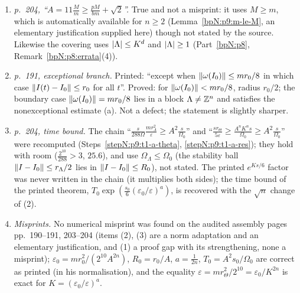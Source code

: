 \begin{remark}
\begin{enumerate}[label=(\arabic*)]
\item \emph{p.~204, ``$A=11\frac Mm\ge\frac{pM}{bm}+\sqrt2$''.} True and not a misprint: it uses $M\ge m$, which is automatically available for $n\ge2$ (Lemma~\ref{bpN:p9:m-le-M}, an elementary justification supplied here) though not stated by the source. Likewise the covering uses $\lvert \Lambda\rvert\le K^d$ and $\lvert \Lambda\rvert\ge1$ (Part~\ref{bpN:p8}, Remark~\ref{bpN:p8:errata}(4)).
\item \emph{p.~191, exceptional branch.} Printed: ``except when $\lVert \omega(I_0)\rVert\le mr_0/8$ in which case $\lVert I(t)-I_0\rVert\le r_0$ for all $t$''. Proved: for $\lVert \omega(I_0)\rVert<mr_0/8$, radius $r_0/2$; the boundary case $\lVert \omega(I_0)\rVert=mr_0/8$ lies in a block $\Lambda\ne\mathbb{Z}^n$ and satisfies the nonexceptional estimate (a). Not a defect; the statement is slightly sharper.
\item \emph{p.~204, time bound.} The chain ``$\frac s{288\Omega}\frac{mr_\Lambda^2}\varepsilon\ge A^2\frac s{\Omega_0}$'' and ``$\frac{sr_\Theta}{5\varepsilon}\ge\frac{A^nK^ns}{\Omega_0}\ge A^2\frac s{\Omega_0}$'' were recomputed (Steps~\ref{stepN:p9:t1-a-theta}, \ref{stepN:p9:t1-a-res}); they hold with room ($\frac{2^{10}}{288}>3$, $25.6$), and use $\Omega_\Lambda\le\Omega_0$ (the stability ball $\lVert I-I_0\rVert\le r_\Lambda/2$ lies in $\lVert I-I_0\rVert\le R_0$), not stated. The printed $e^{Ks/6}$ factor was never written in the chain (it multiplies both sides); the time bound of the printed theorem, $T_0\exp(\frac{s_0}6(\varepsilon_0/\varepsilon)^a)$, is recovered with the $\sqrt n$ change of (2).
\item \emph{Misprints.} No numerical misprint was found on the audited assembly pages pp.~190--191, 203--204 (items (2), (3) are a norm adaptation and an elementary justification, and (1) a proof gap with its strengthening, none a misprint); $\varepsilon_0=mr_0^2/(2^{10}A^{2n})$, $R_0=r_0/A$, $a=\frac1{2n}$, $T_0=A^2s_0/\Omega_0$ are correct as printed (in his normalisation), and the equality $\varepsilon=mr_\Theta^2/2^{10}=\varepsilon_0/K^{2n}$ is exact for $K=(\varepsilon_0/\varepsilon)^a$.
\end{enumerate}
\end{remark}

